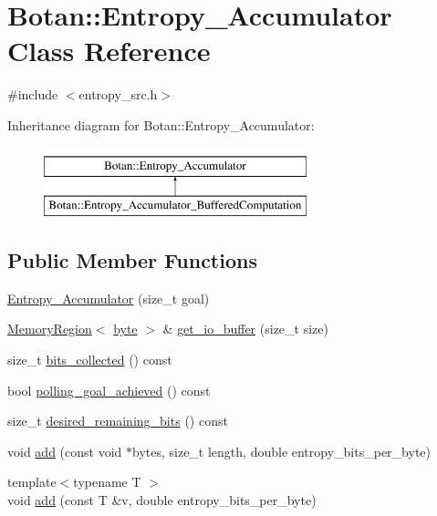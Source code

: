 \hypertarget{classBotan_1_1Entropy__Accumulator}{\section{Botan\-:\-:Entropy\-\_\-\-Accumulator Class Reference}
\label{classBotan_1_1Entropy__Accumulator}
}


{\ttfamily \#include $<$entropy\-\_\-src.\-h$>$}

Inheritance diagram for Botan\-:\-:Entropy\-\_\-\-Accumulator\-:\begin{figure}[H]
\begin{center}
\leavevmode
\includegraphics[height=2.000000cm]{classBotan_1_1Entropy__Accumulator}
\end{center}
\end{figure}
\subsection*{Public Member Functions}
\begin{DoxyCompactItemize}
\item 
\hyperlink{classBotan_1_1Entropy__Accumulator_a3615d4bd634217dd75c873eff92511a5}{Entropy\-\_\-\-Accumulator} (size\-\_\-t goal)
\item 
\hyperlink{classBotan_1_1MemoryRegion}{Memory\-Region}$<$ \hyperlink{namespaceBotan_a7d793989d801281df48c6b19616b8b84}{byte} $>$ \& \hyperlink{classBotan_1_1Entropy__Accumulator_ad83609d00683d61f70ad0f002b7ef83c}{get\-\_\-io\-\_\-buffer} (size\-\_\-t size)
\item 
size\-\_\-t \hyperlink{classBotan_1_1Entropy__Accumulator_a8969fa26d781a602ffd22f47a17a063a}{bits\-\_\-collected} () const 
\item 
bool \hyperlink{classBotan_1_1Entropy__Accumulator_a2af7dc8a8369ee4797bbc26465601acb}{polling\-\_\-goal\-\_\-achieved} () const 
\item 
size\-\_\-t \hyperlink{classBotan_1_1Entropy__Accumulator_ac12a7540b201b7d08875147e3886124a}{desired\-\_\-remaining\-\_\-bits} () const 
\item 
void \hyperlink{classBotan_1_1Entropy__Accumulator_a53836d8915e21b9251725afc0a32b8c4}{add} (const void $\ast$bytes, size\-\_\-t length, double entropy\-\_\-bits\-\_\-per\-\_\-byte)
\item 
{\footnotesize template$<$typename T $>$ }\\void \hyperlink{classBotan_1_1Entropy__Accumulator_a44eb485ed53ba7e5fb74bb712ca16a78}{add} (const T \&v, double entropy\-\_\-bits\-\_\-per\-\_\-byte)
\end{DoxyCompactItemize}


